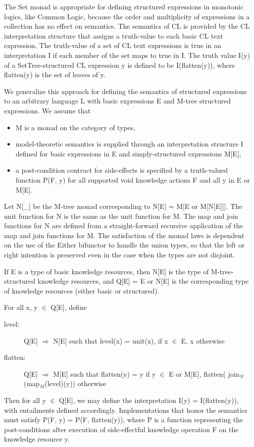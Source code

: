 \documentclass[runningheads]{llncs}
\begin{document}
The Set monad is appropriate for defining structured expressions in monotonic logics, like Common Logic, because the order and multiplicity of expressions in a collection has no effect on semantics. The semantics of CL is provided by the CL interpretation structure that assigns a truth-value to each basic CL text expression. The truth-value of a set of CL text expressions is true in an interpretation I if each member of the set maps to true in I. The truth value I(y) of a SetTree-structured CL expression y is defined to be I(flatten(y)), where flatten(y) is the set of leaves of y.

We generalize this approach for defining the semantics of structured expressions to an arbitrary language L with basic expressions E and M-tree structured expressions. We assume that 
\begin{itemize}
\item M is a monad on the category of types,
\item model-theoretic semantics is supplied through an interpretation structure I defined for basic expressions in E and simply-structured expressions M[E],
\item a post-condition contract for side-effects is specified by a truth-valued function P(F, y) for all supported void knowledge actions F and all y in E or M[E].
\end{itemize}

Let N[\_] be the M-tree monad corresponding to N[E] = M[E or M[N[E]]].
The unit function for N is the same as the unit function for M.
The map and join functions for N are defined from a straight-forward recursive application of the map and join functions for M.
The satisfaction of the monad laws is dependent on the use of the Either bifunctor to handle the union types, so that the left or right intention is preserved even in the case when the types are not disjoint.

If E is a type of basic knowledge resources, then N[E] is the type of M-tree-structured knowledge resources, and
Q[E] = E or N[E] is the corresponding type of knowledge resources (either basic or structured).

For all x, y $\in$ Q[E], define
\begin{description}
\item[level:] Q[E] $\Rightarrow$ N[E] such that level(x) = unit(x), if x $\in$ E, x otherwise
\item[flatten:] Q[E] $\Rightarrow$ M[E] such that flatten(y) = y if y $\in$  E or M[E], flatten( join$_N$(map$_M$(level)(y)) otherwise
\end{description}
Then for all y $\in$ Q[E], we may define the interpretation I(y) = I(flatten(y)), with entailments defined accordingly. %
Implementations that honor the semantics must satisfy P(F, y) = P(F, flatten(y)), where P is a function representing the post-conditions after execution of side-effectful knowledge operation F on the knowledge resource y.
\end{document}
